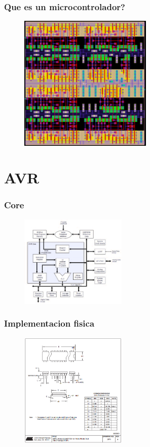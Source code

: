 \documentclass{beamer}
\begin{document}
\begin{frame}
\frametitle{Que es un microcontrolador?}
\begin{figure}[!h]
\centering
\includegraphics[width=2.5in]{ocp-22}
\end{figure}
\end{frame}

\section{AVR}
\begin{frame}
\frametitle{Core}
\begin{figure}[!h]
\centering
\includegraphics[width=2in]{avrcore}
\end{figure}
\end{frame}

\begin{frame}
\frametitle{Implementacion fisica}
\begin{figure}[!h]
\centering
\includegraphics[width=2in]{dibujo}
\end{figure}
\end{frame}
\end{document}
